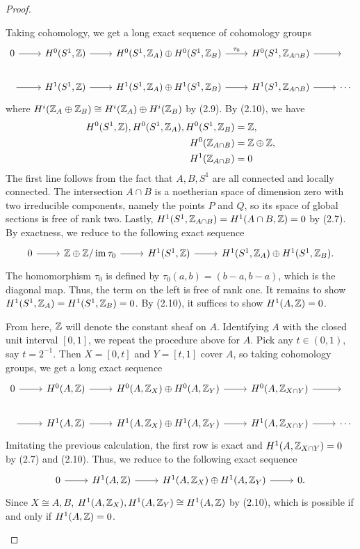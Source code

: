\documentclass{article}
\begin{document}
\begin{enumerate} [label=\textbf{\arabic*.}, leftmargin=0em]
\begin{proof}
\begin{itemize} [leftmargin=0cm]
Taking cohomology, we get a long exact sequence of cohomology groups
\[ \begin{tikzcd}
    0 \arrow[r]  & H^0(S^1, \Z) \arrow[r] & H^0(S^1, \Z_A) \oplus H^0(S^1, \Z_B) \arrow[r, "\tau_0"] & H^0(S^1, \Z_{A \cap B}) \arrow[r] & {}     \\
    {} \arrow[r] & H^1(S^1, \Z) \arrow[r] & H^1(S^1, \Z_A) \oplus H^1(S^1, \Z_B) \arrow[r] & H^1(S^1, \Z_{A \cap B}) \arrow[r] & \cdots
    \end{tikzcd} \]
where $H^i(\mathbb{Z}_A \oplus \mathbb{Z}_B) \cong H^i(\mathbb{Z}_A) \oplus H^i(\mathbb{Z}_B)$ by (2.9). By (2.10), we have
\begin{align*}
    H^0(S^1, \mathbb{Z}), H^0(S^1, \mathbb{Z}_A), H^0(S^1, \mathbb{Z}_B) & = \mathbb{Z}, \\
    H^0(\mathbb{Z}_{A \cap B}) & = \mathbb{Z} \oplus \mathbb{Z}, \\
    H^1(\mathbb{Z}_{A \cap B}) & = 0
\end{align*}
The first line follows from the fact that $A, B , S^1$ are all connected and locally connected. The intersection $A \cap B$ is a noetherian space of dimension zero with two irreducible components, namely the points $P$ and $Q$, so its space of global sections is free of rank two. Lastly, $H^1(S^1, \mathbb{Z}_{A \cap B}) = H^1(A \cap B, \mathbb{Z}) = 0$ by (2.7). By exactness, we reduce to the following exact sequence
\[ \begin{tikzcd}
    0 \arrow[r] & \Z \oplus \Z / \im{\tau_0} \arrow[r] & H^1(S^1,\Z) \arrow[r] & H^1(S^1, \Z_A) \oplus H^1(S^1, \Z_B).
    \end{tikzcd} \]
The homomorphism $\tau_0$ is defined by $\tau_0(a, b) = (b - a, b - a)$, which is the diagonal map. Thus, the term on the left is free of rank one. It remains to show $H^1(S^1, \mathbb{Z}_A) = H^1(S^1, \mathbb{Z}_B) = 0$. By (2.10), it suffices to show $H^1(A, \mathbb{Z}) = 0$.

From here, $\mathbb{Z}$ will denote the constant sheaf on $A$. Identifying $A$ with the closed unit interval $[0, 1]$, we repeat the procedure above for $A$. Pick any $t \in (0, 1)$, say $t = 2^{-1}$. Then $X = [0, t]$ and $Y = [t, 1]$ cover $A$, so taking cohomology groups, we get a long exact sequence
\[ \begin{tikzcd}
    0 \arrow[r]  & H^0(A, \Z) \arrow[r] & H^0(A, \Z_X) \oplus H^0(A, \Z_Y) \arrow[r] & H^0(A, \Z_{X \cap Y}) \arrow[r] & {}     \\
    {} \arrow[r] & H^1(A, \Z) \arrow[r] & H^1(A, \Z_X) \oplus H^1(A, \Z_Y) \arrow[r] & H^1(A, \Z_{X \cap Y}) \arrow[r] & \cdots
    \end{tikzcd} \]
Imitating the previous calculation, the first row is exact and $H^1(A, \mathbb{Z}_{X \cap Y}) = 0$ by (2.7) and (2.10). Thus, we reduce to the following exact sequence
\[ \begin{tikzcd}
    0 \arrow[r] & H^1(A, \Z) \arrow[r] & H^1(A,\Z_X) \oplus H^1(A, \Z_Y) \arrow[r] & 0.
    \end{tikzcd} \]
Since $X \cong A, B$, $H^1(A, \mathbb{Z}_X), H^1(A, \mathbb{Z}_Y) \cong H^1(A, \mathbb{Z})$ by (2.10), which is possible if and only if $H^1(A, \mathbb{Z}) = 0$.


\end{itemize}
\end{proof}
\end{enumerate}
\end{document}
